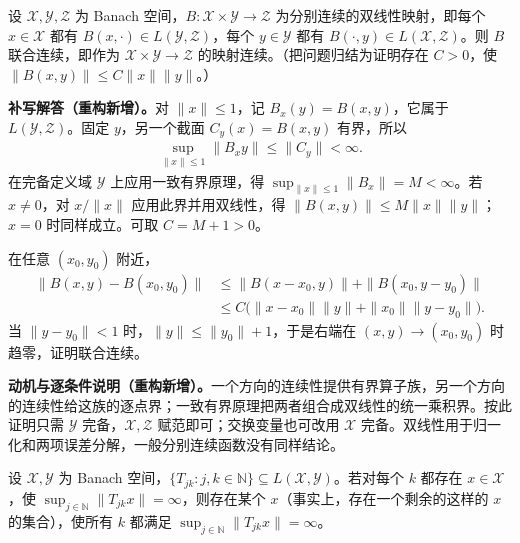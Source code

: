 \documentclass[../../main.tex]{subfiles}
\begin{document}
\begin{exercise}\label{exercise:ch05-bilinear-continuity}
设 $\mathcal X,\mathcal Y,\mathcal Z$ 为 Banach 空间，$B:\mathcal X\times\mathcal Y\to\mathcal Z$ 为分别连续的双线性映射，即每个 $x\in\mathcal X$ 都有 $B(x,\cdot)\in L(\mathcal Y,\mathcal Z)$，每个 $y\in\mathcal Y$ 都有 $B(\cdot,y)\in L(\mathcal X,\mathcal Z)$。则 $B$ 联合连续，即作为 $\mathcal X\times\mathcal Y\to\mathcal Z$ 的映射连续。（把问题归结为证明存在 $C>0$，使 $\|B(x,y)\|\le C\|x\|\|y\|$。）
\end{exercise}
\begin{solution}
\textbf{补写解答（重构新增）。}对 $\|x\|\le1$，记 $B_x(y)=B(x,y)$，它属于 $L(\mathcal Y,\mathcal Z)$。固定 $y$，另一个截面 $C_y(x)=B(x,y)$ 有界，所以
\begin{align*}
\sup_{\|x\|\le1}\|B_xy\|\le\|C_y\|<\infty.
\end{align*}
在完备定义域 $\mathcal Y$ 上应用一致有界原理，得 $\sup_{\|x\|\le1}\|B_x\|=M<\infty$。若 $x\ne0$，对 $x/\|x\|$ 应用此界并用双线性，得 $\|B(x,y)\|\le M\|x\|\|y\|$；$x=0$ 时同样成立。可取 $C=M+1>0$。

在任意 $(x_0,y_0)$ 附近，
\begin{align*}
\|B(x,y)-B(x_0,y_0)\|
&\le\|B(x-x_0,y)\|+\|B(x_0,y-y_0)\|\\
&\le C\bigl(\|x-x_0\|\|y\|+\|x_0\|\|y-y_0\|\bigr).
\end{align*}
当 $\|y-y_0\|<1$ 时，$\|y\|\le\|y_0\|+1$，于是右端在 $(x,y)\to(x_0,y_0)$ 时趋零，证明联合连续。
\end{solution}
\begin{remark}
\textbf{动机与逐条件说明（重构新增）。}一个方向的连续性提供有界算子族，另一个方向的连续性给这族的逐点界；一致有界原理把两者组合成双线性的统一乘积界。按此证明只需 $\mathcal Y$ 完备，$\mathcal X,\mathcal Z$ 赋范即可；交换变量也可改用 $\mathcal X$ 完备。双线性用于归一化和两项误差分解，一般分别连续函数没有同样结论。
\end{remark}
\begin{exercise}[奇性凝聚原理]\label{exercise:ch05-condensation-singularities}
设 $\mathcal X,\mathcal Y$ 为 Banach 空间，$\{T_{jk}:j,k\in\mathbb N\}\subseteq L(\mathcal X,\mathcal Y)$。若对每个 $k$ 都存在 $x\in\mathcal X$，使 $\sup_{j\in\mathbb N}\|T_{jk}x\|=\infty$，则存在某个 $x$（事实上，存在一个剩余的这样的 $x$ 的集合），使所有 $k$ 都满足 $\sup_{j\in\mathbb N}\|T_{jk}x\|=\infty$。
\end{exercise}
\end{document}
